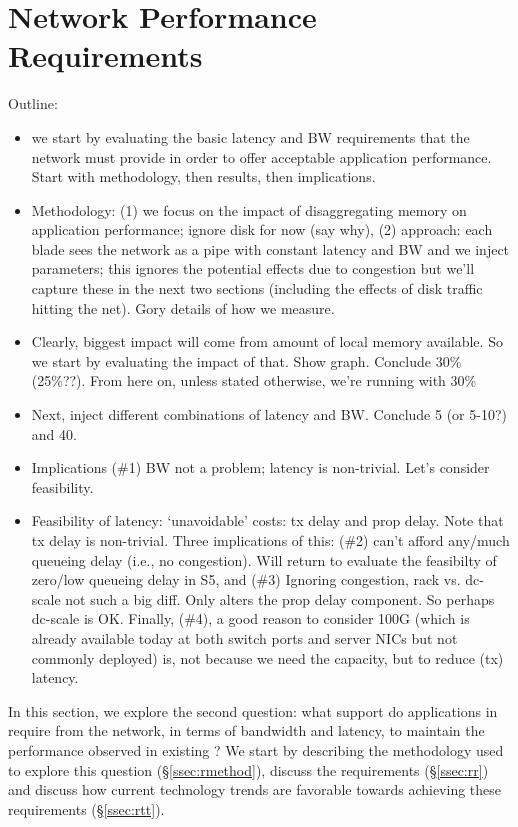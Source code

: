 \section{\dis Network Performance Requirements}
\label{sec:requirements}

Outline: 
\begin{itemize}
\item we start by evaluating the basic latency and BW requirements that the network must provide in order to offer acceptable application performance. Start with methodology, then results, then implications. 
\item Methodology: (1) we focus on the impact of disaggregating memory on application performance; ignore disk for now (say why), (2) approach: each blade sees the network as a pipe with constant latency and BW  and we inject parameters; this ignores the potential effects due to congestion but we'll capture these in the next two sections (including the effects of disk traffic hitting the net). 
Gory details of how we measure.
\item Clearly, biggest impact will come from amount of local memory available. So we start by evaluating the impact of that. Show graph. Conclude 30\% (25\%??). From here on, unless stated otherwise, we're running with 30\%
\item Next, inject different combinations of latency and BW. Conclude 5 (or 5-10?) and 40. 
\item Implications (\#1) BW not a problem; latency is non-trivial. Let's consider feasibility. 
\item Feasibility of latency: `unavoidable' costs: tx delay and prop delay. Note that tx delay is non-trivial. Three implications of this: (\#2) can't afford any/much queueing delay (i.e., no congestion). Will return to evaluate the feasibilty of zero/low queueing delay in S5, and (\#3) Ignoring congestion, rack vs. dc-scale not such a big diff. Only alters the prop delay component. So perhaps dc-scale is OK. Finally, (\#4), a good reason to consider 100G (which is already available today at both switch ports and server NICs but not commonly deployed) is, not because we need the capacity, but to reduce (tx) latency. 
\end{itemize}

In this section, we explore the second question: what support do applications in \dis require from the network, in terms of bandwidth and latency, to maintain the performance observed in existing \pdis? We start by describing the methodology used to explore this question (\S\ref{ssec:rmethod}), discuss the requirements (\S\ref{ssec:rr}) and discuss how current technology trends are favorable towards achieving these requirements (\S\ref{ssec:rtt}).

